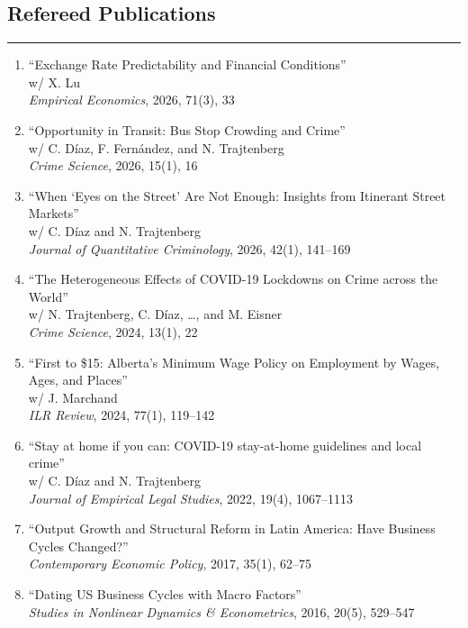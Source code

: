 \documentclass[overlapped,letterpaper,11pt]{res}
\newcommand{\doi}[1]{\href{https://doi.org/#1}{%
  \doibox{\textcolor{doiblue}{\scriptsize\bfseries DOI}}}}
\newcommand{\cvrule}{%
  \hspace*{-\sectionwidth}%
  \rule[2mm]{\dimexpr\textwidth+\sectionwidth\relax}{.25pt}}
\newcommand{\cvsection}[1]{%
  \needspace{4\baselineskip}%
  \section{\textbf{#1}}%
  \cvrule}
\newenvironment{cventries}%
  {\begin{enumerate}\interlinepenalty=10000\relax}%
  {\end{enumerate}}
\begin{document}
\begin{resume}
\cvsection{Refereed Publications}
\begin{cventries}
\item ``Exchange Rate Predictability and Financial Conditions'' \\
	w/ X. Lu \\
	\textit{Empirical Economics}, 2026, 71(3), 33 \doi{10.1007/s00181-026-02971-w}
\item ``Opportunity in Transit: Bus Stop Crowding and Crime'' \\
	w/ C. D\'iaz, F. Fern\'andez, and N. Trajtenberg \\
	\textit{Crime Science}, 2026, 15(1), 16 \doi{10.1186/s40163-026-00277-x}
\item ``When `Eyes on the Street' Are Not Enough: Insights from Itinerant Street Markets'' \\
	w/ C. D\'iaz and N. Trajtenberg \\
	\textit{Journal of Quantitative Criminology}, 2026, 42(1), 141--169 \doi{10.1007/s10940-025-09620-y}
\item ``The Heterogeneous Effects of COVID-19 Lockdowns on Crime across the World'' \\
	w/ N. Trajtenberg, C. D\'iaz, \dots, and M. Eisner \\
	\textit{Crime Science}, 2024, 13(1), 22 \doi{10.1186/s40163-024-00220-y}
\item ``First to \$15: Alberta's Minimum Wage Policy on Employment by Wages, Ages, and Places'' \\
	w/ J. Marchand \\
	\textit{ILR Review}, 2024, 77(1), 119--142 \doi{10.1177/00197939231213064}
\item ``Stay at home if you can: COVID-19 stay-at-home guidelines and local crime'' \\
	w/ C. D\'iaz and N. Trajtenberg \\
	\textit{Journal of Empirical Legal Studies}, 2022, 19(4), 1067--1113 \doi{10.1111/jels.12336}
\item ``Output Growth and Structural Reform in Latin America: Have Business Cycles Changed?'' \\
	\textit{Contemporary Economic Policy}, 2017, 35(1), 62--75 \doi{10.1111/coep.12178}
\item ``Dating US Business Cycles with Macro Factors'' \\
	\textit{Studies in Nonlinear Dynamics \& Econometrics}, 2016, 20(5), 529--547 \doi{10.1515/snde-2015-0037}

\end{cventries}
\end{resume}
\end{document}
